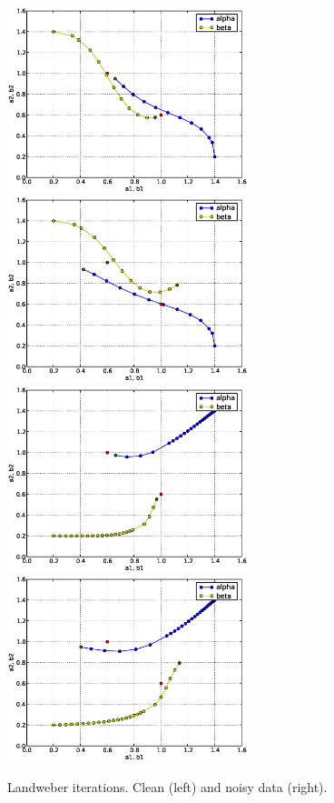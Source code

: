 \begin{figure}
\begin{center}
    \includegraphics[width=7cm]{chapters/schroll/eps/4D-1scan3b.eps}
    \includegraphics[width=7cm]{chapters/schroll/eps/4D-1scan3b-5.eps}
    \includegraphics[width=7cm]{chapters/schroll/eps/4D-1scan4b.eps}
    \includegraphics[width=7cm]{chapters/schroll/eps/4D-1scan4b-5.eps}
    \end{center}
    \vspace{-0.7cm}
  \caption{Landweber iterations. Clean (left) and noisy data (right). \label{fig6}}
\end{figure}


